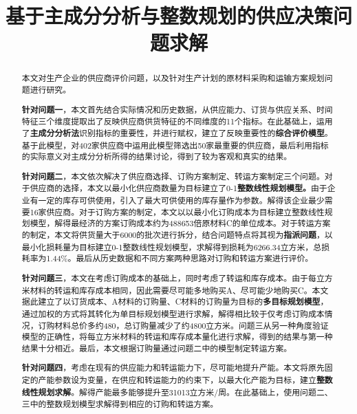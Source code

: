 \documentclass[withoutpreface,bwprint]{cumcmthesis} %
\title{基于主成分分析与整数规划的供应决策问题求解}
\begin{document}
 \maketitle

 \begin{abstract}


本文对生产企业的供应商评价问题，以及针对生产计划的原材料采购和运输方案规划问题进行研究。

\textbf{针对问题一}，本文首先结合实际情况和历史数据，从供应能力、订货与供应关系、时间特征三个维度提取出了反映供应商供货特征的不同维度的11个指标。在此基础上，运用了\textbf{主成分分析法}识别指标的重要性，并进行赋权，建立了反映重要性的\textbf{综合评价模型}。基于此模型，对402家供应商中运用此模型筛选出50家最重要的供应商，最后利用指标的实际意义对主成分分析所得的结果讨论，得到了较为客观和真实的结果。

\textbf{针对问题二}，本文依次解决了供应商选择、订购方案制定、转运方案制定三个问题。对于供应商的选择，本文以最小化供应商数量为目标建立了0-1\textbf{整数线性规划模型。}由于企业有一定的库存可供使用，引入了最大可供使用的库存量作为参数。解得该企业最少需要16家供应商。对于订购方案的制定，本文以以最小化订购成本为目标建立整数线性规划模型，解得最经济的方案订购成本约为488653倍原材料C的单位成本。对于转运方案的制定，本文将供货量大于6000的批次进行拆分，结合问题特点将其视为\textbf{指派问题}，以最小化损耗量为目标建立0-1整数线性规划模型，求解得到损耗为6266.34立方米，总损耗率为1.44\%。最后从历史数据和不同方案两种思路对订购和转运方案进行评价。

\textbf{针对问题三}，本文在考虑订购成本的基础上，同时考虑了转运和库存成本。由于每立方米材料的转运和库存成本相同，因此需要尽可能多地购买A、尽可能少地购买C。本文据此建立了以订货成本、A材料的订购量、C材料的订购量为目标的\textbf{多目标规划模型}，通过加权的方式将其转化为单目标规划模型进行求解，解得相比较于仅考虑订购成本情况，订购材料总价多约480，总订购量减少了约4800立方米。问题三从另一种角度验证模型的正确性，将每立方米材料的转运和库存成本量化进行求解，得到的结果与第一种结果十分相近。最后，本文根据订购量通过问题二中的模型制定转运方案。

\textbf{针对问题四}，考虑在现有的供应能力和转运能力下，尽可能地提升产能。本文将原先固定的产能参数设为变量，在供应和转运能力的约束下，以最大化产能为目标，建立\textbf{整数线性规划求解}。解得产能最多能够提升至31013立方米/周。在此基础上，使用问题二、三中的整数规划模型求解得到相应的订购和转运方案。


\end{abstract}
\end{document}
